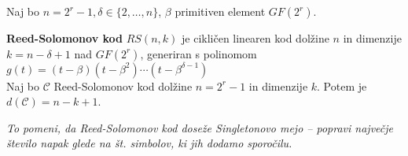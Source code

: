 \begin{multicols}{5}
Naj bo $n=2^r-1, \delta\in\{2,\ldots,n\}$, $\beta$ primitiven element $GF(2^r)$. 

\textbf{Reed-Solomonov kod} $RS(n,k)$ je cikličen linearen kod dolžine $n$ in dimenzije $k=n-\delta+1$ nad $GF(2^r)$,
generiran s polinomom $g(t) = (t-\beta)(t-\beta^2)\cdots(t-\beta^{\delta-1})$\\

Naj bo $\mathcal{C}$ Reed-Solomonov kod dolžine $n=2^r-1$ in dimenzije $k$.
Potem je $d(\mathcal{C})=n-k+1$.

\textit{To pomeni, da Reed-Solomonov kod doseže Singletonovo mejo -- popravi največje število napak
glede na št. simbolov, ki jih dodamo sporočilu.}
\end{multicols}


